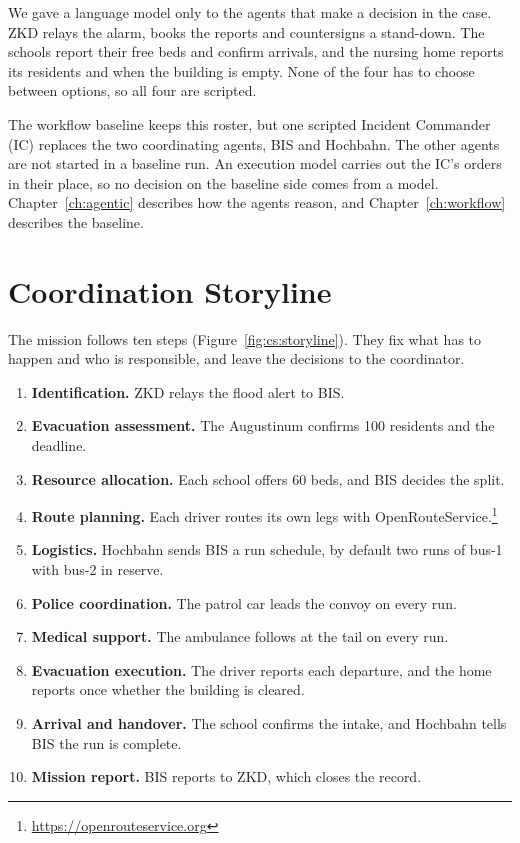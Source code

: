 We gave a language model only to the agents that make a decision in the case.
ZKD relays the alarm, books the reports and countersigns a stand-down. The
schools report their free beds and confirm arrivals, and the nursing home
reports its residents and when the building is empty. None of the four has to
choose between options, so all four are scripted.

The workflow baseline keeps this roster, but one scripted Incident Commander (IC)
replaces the two coordinating agents, BIS and Hochbahn. The other agents are
not started in a baseline run. An execution model carries out the IC's orders
in their place, so no decision on the baseline side comes from a model.
Chapter~\ref{ch:agentic} describes how the agents reason, and
Chapter~\ref{ch:workflow} describes the baseline.

\section{Coordination Storyline}
\label{sec:cs:storyline}

The mission follows ten steps (Figure~\ref{fig:cs:storyline}). They fix what
has to happen and who is responsible, and leave the decisions to the
coordinator.

\begin{enumerate}
  \item \textbf{Identification.} ZKD relays the flood alert to BIS.
  \item \textbf{Evacuation assessment.} The Augustinum confirms 100 residents
  and the deadline.
  \item \textbf{Resource allocation.} Each school offers 60 beds, and BIS
  decides the split.
  \item \textbf{Route planning.} Each driver routes its own legs with
  OpenRouteService.\footnote{\url{https://openrouteservice.org}}
  \item \textbf{Logistics.} Hochbahn sends BIS a run schedule, by default two
  runs of bus-1 with bus-2 in reserve.
  \item \textbf{Police coordination.} The patrol car leads the convoy on every
  run.
  \item \textbf{Medical support.} The ambulance follows at the tail on every run.
  \item \textbf{Evacuation execution.} The driver reports each departure, and
  the home reports once whether the building is cleared.
  \item \textbf{Arrival and handover.} The school confirms the intake, and
  Hochbahn tells BIS the run is complete.
  \item \textbf{Mission report.} BIS reports to ZKD, which closes the record.
\end{enumerate}

